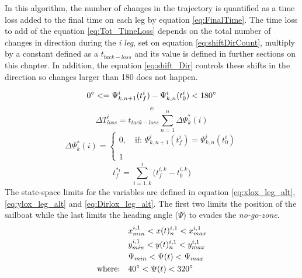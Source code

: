 In this algorithm, the number of changes in the trajectory is quantified as a time loss added to the final time on each leg by equation \ref{eq:FinalTime}. The time loss to add of the equation \ref{eq:Tot_TimeLoss} depends on the total number of changes in direction during the \textit{i leg}, set on equation \ref{eq:shiftDirCount}, multiply by a constant defined as a $t_{tack-loss}$ and its value is defined in further sections on this chapter. In addition, the equation \ref{eq:shift_Dir} controls these shifts in the direction so changes larger than 180 \degree  does not happen.\par 
\begin{equation}\label{eq:shift_Dir}
    0 \degree <=\Psi_{k,n+1}^{i}(t_{f}^{i}) - \Psi_{k,n}^{i}(t_{0}^{i}) <180 \degree
\end{equation}
\begin{equation} \label{eq:FinalTime}
e\end{equation}
\begin{equation} \label{eq:Tot_TimeLoss}
    \Delta T_{loss}^i=t_{tack-loss} \sum_{n=1}^{n} \Delta \Psi_{k}^* (i)
\end{equation}
\begin{equation} \label{eq:shiftDirCount}
\Delta\Psi_{k}^*(i)=
\begin{cases}
0, \quad  \text{if: } \Psi_{k,n+1}^{i}(t_{f}^{i}) = \Psi_{k,n}^{i}(t_{0}^{i})\\
\\
1 %
\end{cases}
\end{equation}
\begin{equation} \label{eq:TimeFinal_acum}
    t_{f}^{*i}=\sum_{i=1,k}^{i} \Big( t_{f}^{i,k} - t_{0}^{i,k} \Big)
\end{equation}
The state-space limits for the variables are defined in equation \ref{eq:xlox_leg_alt}, \ref{eq:ylox_leg_alt} and \ref{eq:Dirlox_leg_alt}.  The first two limits the position of the sailboat while the last limits the heading angle ($\Psi$) to evades the \textit{no-go-zone}.
\begin{align}
    \quad & x_{min}^{i,1}<x(t)_{n}^{i,1}<x_{max}^{i,1} \label{eq:xlox_leg_alt}\\
   \quad & y_{min}^{i,1}<y(t)_{n}^{i,1}<y_{max}^{i,1} \label{eq:ylox_leg_alt}\\
   \quad & \Psi_{min} <\Psi(t)< \Psi_{max} \label{eq:Dirlox_leg_alt} \\
  \text{where:} \quad & 40\degree  <\Psi(t)< 320\degree \nonumber 
\end{align}
